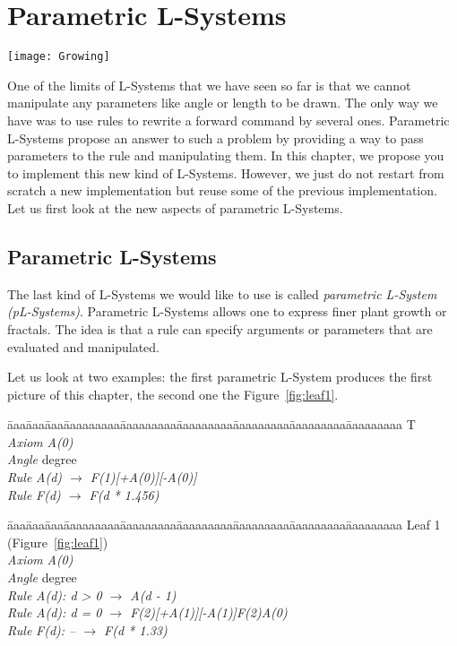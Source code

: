 \ifx\wholebook\relax\else



\fi

\project
\chapter{Parametric L-Systems}\label{ch:parametric}

\begin{chapterfigure}
\texttt{[image: Growing]}
\end{chapterfigure}


One of the limits of L-Systems that we have seen so far is that we
cannot manipulate any parameters like angle or length to be drawn. The
only way we have was to use rules to rewrite a forward command by
several ones.  Parametric L-Systems propose an answer to such a
problem by providing a way to pass parameters to the rule and
manipulating them.  In this chapter, we propose you to implement this
new kind of L-Systems.  However, we just do not restart from scratch a
new implementation but reuse some of the previous implementation.  Let
us first look at the new aspects of parametric L-Systems.

\section{Parametric L-Systems}\label{sec:param}
The last kind of L-Systems we would like to use is called
\emph{parametric L-System} \emph{(pL-Systems)}. Parametric L-Systems 
allows one to express finer plant growth or fractals. The idea is that
a rule can specify arguments or parameters that are evaluated and
manipulated.

Let us look at two examples: the first parametric L-System produces
the first picture of this chapter, the second one the
Figure~\ref{fig:leaf1}.

\begin{tabbing}
\=aaa\=aaa\=aaa\=aaaaaaaaa\=aaaaaaaaa\=aaaaaaaaa\=aaaaaaaaa\=aaaaaaaaa\=aaaaaaaaa\kill
T \\
\>\>\>\> \emph{Axiom} \>\>\emph{A(0)}\\
\>\>\>\> \emph{Angle} \> degree\\
\>\>\>\> \emph{Rule}  \>\>\emph{A(d) $\rightarrow$ F(1)[+A(0)][-A(0)]}\\
\>\>\>\> \emph{Rule}  \>\>\emph{F(d) $\rightarrow$ F(d * 1.456)}
\end{tabbing}


\begin{tabbing}
\=aaa\=aaa\=aaa\=aaaaaaaaa\=aaaaaaaaa\=aaaaaaaaa\=aaaaaaaaa\=aaaaaaaaa\=aaaaaaaaa\kill
Leaf 1 (Figure~\ref{fig:leaf1})\\
\>\>\>\> \emph{Axiom} \>\>\emph{A(0)}\\
\>\>\>\> \emph{Angle} \> degree\\
\>\>\>\> \emph{Rule}  \>\>\emph{A(d): d > 0 $\rightarrow$ A(d - 1)}\\
\>\>\>\> \emph{Rule}  \>\>\emph{A(d): d = 0 $\rightarrow$ F(2)[+A(1)][-A(1)]F(2)A(0)}\\
\>\>\>\> \emph{Rule}  \>\>\emph{F(d): -- $\rightarrow$ F(d * 1.33)}
\end{tabbing}

